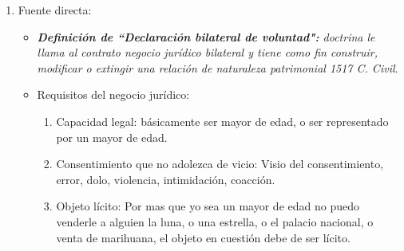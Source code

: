 \begin{enumerate}
    
    \item Fuente directa:
        \begin{itemize}
            \item \emph{\textbf{Definición de ``Declaración bilateral de voluntad":} doctrina le llama al contrato negocio jurídico bilateral y tiene como fin construir, modificar o extingir una relación de naturaleza patrimonial 1517 C. Civil}.
            \item Requisitos del negocio jurídico:
                \begin{enumerate}
                    \item Capacidad legal: básicamente ser mayor de edad, o ser representado por un mayor de edad.
                    \item Consentimiento que no adolezca de vicio: Visio del consentimiento, error, dolo, violencia, intimidación, coacción.
                    \item Objeto lícito: Por mas que yo sea un mayor de edad no puedo venderle a alguien la luna, o una estrella, o el palacio nacional, o venta de marihuana, el objeto en cuestión debe de ser lícito.
                \end{enumerate}
        \end{itemize}
        
        
        
\end{enumerate}

